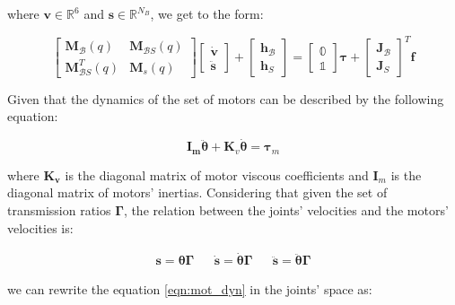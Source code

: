 where $\mathrm{\mathbf{v}} \in \mathbb{R} ^{6}$ and $\mathbf{s} \in \mathbb{R}^{N_B}$, we get to the form:

\begin{equation}
    \begin{bmatrix}
        \mathbf{M} _{\mathcal{B}}(q)     & \mathbf{M} _{\mathcal{B}S}(q) \\
        \mathbf{M} _{\mathcal{B}S} ^T(q) & \mathbf{M} _s(q)
    \end{bmatrix}
    \begin{bmatrix}
        \dot{\mathrm{\mathbf{v}}} \\
        \ddot{\mathbf{s}}
    \end{bmatrix}+
    \begin{bmatrix}
        \mathbf{h} _{\mathcal{B}} \\
        \mathbf{h} _S
    \end{bmatrix}=
    \begin{bmatrix}
        \mathbb{0} \\
        \mathbb{1}
    \end{bmatrix}
    \boldsymbol{\tau}
    +
    \begin{bmatrix}
        \mathbf{J} _{\mathcal{B}} \\
        \mathbf{J} _S
    \end{bmatrix} ^T
    \mathbf{f}
\end{equation}

Given that the dynamics of the set of motors can be described by the following equation:

\begin{equation}
    \label{eqn:mot_dyn}
    \mathbf{I_m} \ddot{\boldsymbol{\theta}} + \mathbf{K}_v \dot{\boldsymbol{\theta}} = \boldsymbol{\tau}_m
\end{equation}

where $\mathbf{K _v}$ is the diagonal matrix of motor viscous coefficients and $\mathbf{I}_m$ is the diagonal matrix of motors' inertias. Considering that given the set of transmission ratios $\boldsymbol{\Gamma}$, the relation between the joints' velocities and the motors' velocities is:

\begin{align}
    \mathbf{s} = \boldsymbol{\theta} \boldsymbol{\Gamma} &  & \dot{\mathbf{s}} = \dot{\boldsymbol{\theta}} \boldsymbol{\Gamma} &  & \ddot{\mathbf{s}} = \ddot{\boldsymbol{\theta}} \boldsymbol{\Gamma}
\end{align}

we can rewrite the equation \ref{eqn:mot_dyn} in the joints' space as:

